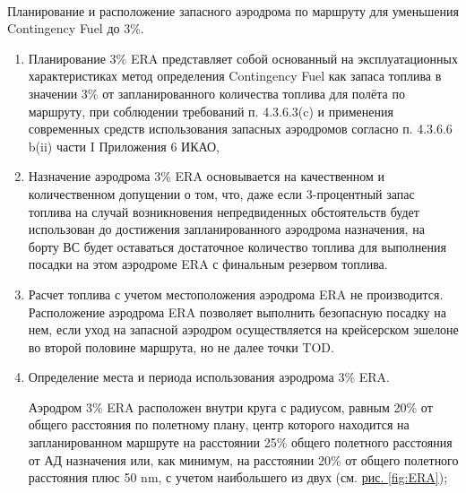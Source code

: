 \paragraph{} \label{par:497}Планирование и расположение запасного аэродрома по маршруту для уменьшения Contingency Fuel до 3\%.
\begin{enumerate}
    \item Планирование 3\% ERA представляет собой основанный на эксплуатационных характеристиках метод определения Contingency Fuel как запаса топлива в значении 3\% от запланированного количества топлива для полёта по маршруту, при соблюдении требований п. 4.3.6.3(c) и применения современных средств использования запасных аэродромов согласно п. 4.3.6.6 b(ii) части I Приложения 6 ИКАО,
    \item Назначение аэродрома 3\% ERA основывается на качественном и количественном допущении о том, что, даже если 3-процентный запас топлива на случай возникновения непредвиденных обстоятельств будет использован до достижения запланированного аэродрома назначения, на борту ВС будет оставаться достаточное количество топлива для выполнения посадки на этом аэродроме ERA с финальным резервом топлива.
    \item Расчет топлива с учетом местоположения аэродрома ERA не производится. Расположение аэродрома ERA позволяет выполнить безопасную посадку на нем, если уход на запасной аэродром осуществляется на крейсерском эшелоне во второй половине маршрута, но не далее точки TOD.
    \item Определение места и периода использования аэродрома 3\% ERA. 
    
    Аэродром 3\% ERA расположен внутри круга с радиусом, равным 20\% от общего расстояния по полетному плану, центр которого находится на запланированном маршруте на расстоянии 25\% общего полетного расстояния от АД назначения или, как минимум, на расстоянии 20\% от общего полетного расстояния плюс 50 nm, с учетом наибольшего из двух (см. \hyperref[fig:ERA]{рис. \ref*{fig:ERA}}); 


\end{enumerate}
